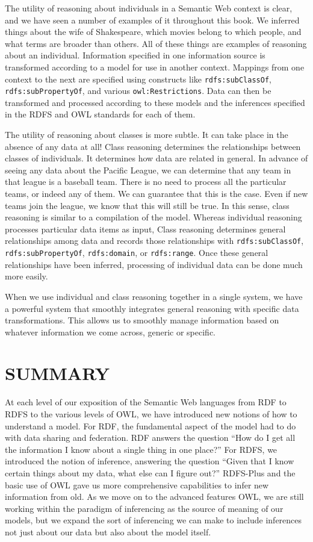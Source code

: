 The utility of reasoning about individuals in a Semantic Web context is
clear, and we have seen a number of examples of it throughout this book.
We inferred things about the wife of Shakespeare, which movies belong to
which people, and what terms are broader than others. All of these
things are examples of reasoning about an individual. Information
specified in one information source is transformed according to a model
for use in another context. Mappings from one context to the next are
specified using constructs like \texttt{rdfs:subClassOf}, \texttt{rdfs:subPropertyOf}, and
various \texttt{owl:Restrictions}. Data can then be transformed and processed
according to these models and the inferences specified in the RDFS and
OWL standards for each of them.

The utility of reasoning about classes is more subtle. It can take place
in the absence of any data at all! Class reasoning determines the
relationships between classes of individuals. It determines how data are
related in general. In advance of seeing any data about the Pacific
League, we can determine that any team in that league is a baseball
team. There is no need to process all the particular teams, or indeed
any of them. We can guarantee that this is the case. Even if new teams
join the league, we know that this will still be true. In this sense,
class reasoning is similar to a compilation of the model. Whereas
individual reasoning processes particular data items as input, Class
reasoning determines general relationships among data and records those
relationships with \texttt{rdfs:subClassOf}, \texttt{rdfs:subPropertyOf}, \texttt{rdfs:domain}, or
\texttt{rdfs:range}. Once these general relationships have been inferred,
processing of individual data can be done much more easily.

When we use individual and class reasoning together in a single system,
we have a powerful system that smoothly integrates general reasoning
with specific data transformations. This allows us to smoothly manage
information based on whatever information we come across, generic or
specific.

\section{SUMMARY}

At each level of our exposition of the Semantic Web languages from RDF
to RDFS to the various levels of OWL, we have introduced new notions of
how to understand a model. For RDF, the fundamental aspect of the model
had to do with data sharing and federation. RDF answers the question
``How do I get all the information I know about a single thing in one
place?'' For RDFS, we introduced the notion of inference, answering the
question ``Given that I know certain things about my data, what else can
I figure out?'' RDFS-Plus and the basic use of OWL gave us more
comprehensive capabilities to infer new information from old. As we move
on to the advanced features OWL, we are still working within the
paradigm of inferencing as the source of meaning of our models, but we
expand the sort of inferencing we can make to include inferences not
just about our data but also about the model itself.

